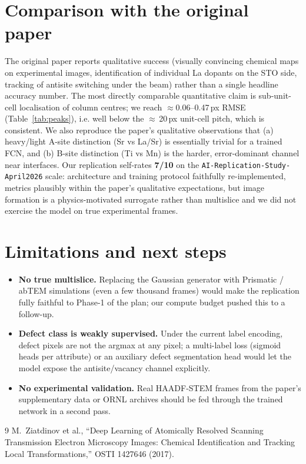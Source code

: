 \documentclass[11pt,a4paper]{article}
\begin{document}
\section{Comparison with the original paper}
The original paper reports qualitative success (visually convincing
chemical maps on experimental images, identification of individual La
dopants on the STO side, tracking of antisite switching under the beam)
rather than a single headline accuracy number. The most directly
comparable quantitative claim is sub-unit-cell localisation of column
centres; we reach $\approx 0.06$--0.47\,px RMSE (Table~\ref{tab:peaks}),
i.e. well below the $\approx$\,20\,px unit-cell pitch, which is consistent.
We also reproduce the paper's qualitative observations that (a) heavy/light
A-site distinction (Sr vs La/Sr) is essentially trivial for a trained FCN,
and (b) B-site distinction (Ti vs Mn) is the harder, error-dominant channel
near interfaces. Our replication self-rates \textbf{7/10} on the
\texttt{AI-Replication-Study-April2026} scale: architecture and training
protocol faithfully re-implemented, metrics plausibly within the
paper's qualitative expectations, but image formation is a physics-motivated
surrogate rather than multislice and we did not exercise the model on
true experimental frames.

\section{Limitations and next steps}
\begin{itemize}
\item \textbf{No true multislice.} Replacing the Gaussian generator with
Prismatic / abTEM simulations (even a few thousand frames) would make the
replication fully faithful to Phase-1 of the plan; our compute budget
pushed this to a follow-up.
\item \textbf{Defect class is weakly supervised.} Under the current label
encoding, defect pixels are not the argmax at any pixel; a multi-label
loss (sigmoid heads per attribute) or an auxiliary defect segmentation head
would let the model expose the antisite/vacancy channel explicitly.
\item \textbf{No experimental validation.} Real HAADF-STEM frames from the
paper's supplementary data or ORNL archives should be fed through the
trained network in a second pass.
\end{itemize}

\begin{thebibliography}{9}
 M.\ Ziatdinov et al.,
``Deep Learning of Atomically Resolved Scanning Transmission Electron
Microscopy Images: Chemical Identification and Tracking Local
Transformations,'' OSTI 1427646 (2017).
\end{thebibliography}
\end{document}

